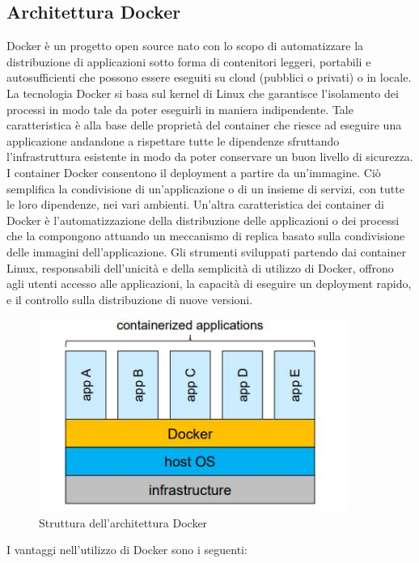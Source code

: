 \subsection{Architettura Docker}
Docker è un progetto open source nato con lo scopo di automatizzare la distribuzione di applicazioni sotto forma di contenitori leggeri, portabili e autosufficienti che possono essere eseguiti su cloud (pubblici o privati) o in locale. La tecnologia Docker si basa sul kernel di Linux che garantisce l'isolamento dei processi in modo tale da poter eseguirli in maniera indipendente. Tale caratteristica è alla base delle proprietà del container che riesce ad eseguire una applicazione andandone a rispettare tutte le dipendenze sfruttando l'infrastruttura esistente in modo da poter conservare un buon livello di sicurezza. 
I container Docker consentono il deployment a partire da un'immagine. Ciò semplifica la condivisione di un'applicazione o di un insieme di servizi, con tutte le loro dipendenze, nei vari ambienti. Un'altra caratteristica dei container di Docker è l'automatizzazione della distribuzione delle applicazioni o dei processi che la compongono attuando un meccanismo di replica basato sulla condivisione delle immagini dell'applicazione. Gli strumenti sviluppati partendo dai container Linux, responsabili dell'unicità e della semplicità di utilizzo di Docker, offrono agli utenti accesso alle applicazioni, la capacità di eseguire un deployment rapido, e il controllo sulla distribuzione di nuove versioni.
\begin{figure}[h]
    \centering
    \includegraphics[width=0.9\textwidth]{img/infrastructure-docker.jpg}
    \caption{Struttura dell'architettura Docker}
    \label{fig:infrastructure-dockere}
\end{figure}
I vantaggi nell'utilizzo di Docker sono i seguenti: 
